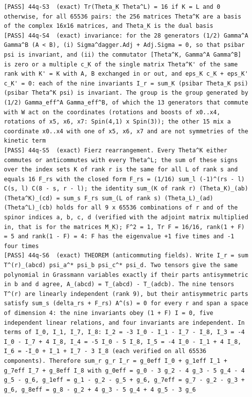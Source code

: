 \documentclass[
  10pt,
]{article}
\begin{document}
\begin{verbatim}
[PASS] 44q-S3  (exact) Tr(Theta_K Theta^L) = 16 if K = L and 0 otherwise, for all 65536 pairs: the 256 matrices Theta^K are a basis of the complex 16x16 matrices, and Theta_K is the dual basis
[PASS] 44q-S4  (exact) invariance: for the 28 generators (1/2) Gamma^A Gamma^B (A < B), (i) Sigma^dagger.Adj + Adj.Sigma = 0, so that psibar psi is invariant, and (ii) the commutator [Theta^K, Gamma^A Gamma^B] is zero or a multiple c_K of the single matrix Theta^K' of the same rank with K' = K with A, B exchanged in or out, and eps_K c_K + eps_K' c_K' = 0: each of the nine invariants I_r = sum_K (psibar Theta_K psi)(psibar Theta^K psi) is invariant. The group is the group generated by (1/2) Gamma_eff^A Gamma_eff^B, of which the 13 generators that commute with W act on the coordinates (rotations and boosts of x0..x4, rotations of x5, x6, x7: Spin(4,1) x Spin(3)); the other 15 mix a coordinate x0..x4 with one of x5, x6, x7 and are not symmetries of the kinetic term
[PASS] 44q-S5  (exact) Fierz rearrangement. Every Theta^K either commutes or anticommutes with every Theta^L; the sum of these signs over the index sets K of rank r is the same for all L of rank s and equals 16 F_rs with the closed form F_rs = (1/16) sum_l (-1)^(rs - l) C(s, l) C(8 - s, r - l); the identity sum_(K of rank r) (Theta_K)_(ab) (Theta^K)_(cd) = sum_s F_rs sum_(L of rank s) (Theta_L)_(ad) (Theta^L)_(cb) holds for all 9 x 65536 combinations of r and of the spinor indices a, b, c, d (verified with the adjoint matrix multiplied in, that is for the matrices M_K); F^2 = 1, Tr F = 16/16, rank(1 + F) = 5 and rank(1 - F) = 4: F has the eigenvalue +1 five times and -1 four times
[PASS] 44q-S6  (exact) THEOREM (anticommuting fields). Write I_r = sum T^(r)_(abcd) psi_a^* psi_b psi_c^* psi_d. Two tensors give the same polynomial in Grassmann variables exactly if their parts antisymmetric in b and d agree, A_(abcd) = T_(abcd) - T_(adcb). The nine tensors T^(r) are linearly independent (rank 9), but their antisymmetric parts satisfy sum_s (delta_rs + F_rs) A^(s) = 0 for every r and span a space of dimension 4: the nine invariants obey (1 + F) I = 0, five independent linear relations, and four invariants are independent. In terms of I_0, I_1, I_7, I_8: I_2 = -3 I_0 - I_1 - I_7 - I_8, I_3 = -4 I_0 - I_7 + 4 I_8, I_4 = -5 I_0 - 5 I_8, I_5 = -4 I_0 - I_1 + 4 I_8, I_6 = -I_0 + I_1 + I_7 - 3 I_8 (each verified on all 65536 components). Therefore sum_r g_r I_r = g_0eff I_0 + g_1eff I_1 + g_7eff I_7 + g_8eff I_8 with g_0eff = g_0 - 3 g_2 - 4 g_3 - 5 g_4 - 4 g_5 - g_6, g_1eff = g_1 - g_2 - g_5 + g_6, g_7eff = g_7 - g_2 - g_3 + g_6, g_8eff = g_8 - g_2 + 4 g_3 - 5 g_4 + 4 g_5 - 3 g_6

\end{verbatim}
\end{document}
